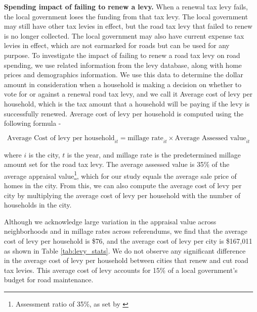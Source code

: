 {\bf Spending impact of failing to renew a levy.} When a renewal tax levy fails, the local government loses the funding from that tax levy. The local government may still have other tax levies in effect, but the road tax levy that failed to renew is no longer collected. The local government may also have current expense tax levies in effect, which are not earmarked for roads but can be used for any purpose. To investigate the impact of failing to renew a road tax levy on road spending, we use related information from the levy database, along with home prices and demographics information. We use this data to determine the dollar amount in consideration when a household is making a decision on whether to vote for or against a renewal road tax levy, and we call it Average cost of levy per household, which is the tax amount that a household will be paying if the levy is successfully renewed. Average cost of levy per household is computed using the following formula -

\begin{equation}
\text{Average Cost of levy per household}_{it} = \text{millage rate}_{it} \times \text{Average Assessed value}_{it}
\end{equation}

where $i$ is the city, $t$ is the year, and millage rate is the predetermined millage amount set for the road tax levy. The average assessed value is 35\% of the average appraisal value\footnote{Assessment ratio of 35\%, as set by \cite{OhioRealPropertyTax}}, which for our study equals the average sale price of homes in the city. From this, we can also compute the average cost of levy per city by multiplying the average cost of levy per household with the number of households in the city.

Although we acknowledge large variation in the appraisal value across neighborhoods and in millage rates across referendums, we find that the average cost of levy per household is \$76, and the average cost of levy per city is \$167,011 as shown in Table \ref{tab:levy_stats}.  We do not observe any significant difference in the average cost of levy per household between cities that renew and cut road tax levies. This average cost of levy accounts for 15\% of a local government's budget for road maintenance.


